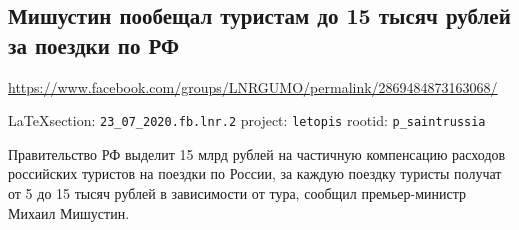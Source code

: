  
 

\subsection{Мишустин пообещал туристам до 15 тысяч рублей за поездки по РФ}
\label{sec:23_07_2020.fb.lnr.2}
\url{https://www.facebook.com/groups/LNRGUMO/permalink/2869484873163068/}
  
\vspace{0.5cm}
{\small\LaTeX section: \verb|23_07_2020.fb.lnr.2| project: \verb|letopis| rootid: \verb|p_saintrussia|}
\vspace{0.5cm}

Правительство РФ выделит 15 млрд рублей на частичную компенсацию расходов
российских туристов на поездки по России, за каждую поездку туристы получат от
5 до 15 тысяч рублей в зависимости от тура, сообщил премьер-министр Михаил
Мишустин.
